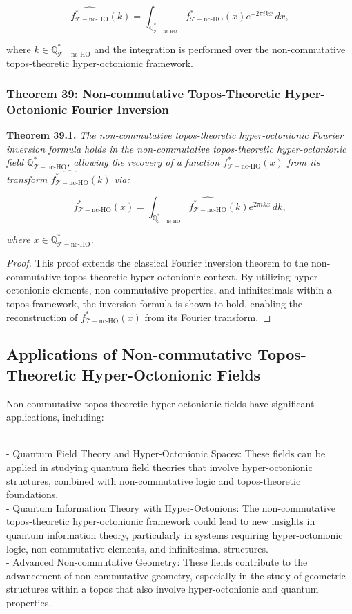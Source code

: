 \documentclass{article}
\begin{document}
\[
\widehat{f_{\mathcal{T}-\text{nc-HO}}^*}(k) = \int_{\mathbb{Q}_{\mathcal{T}-\text{nc-HO}}^*} f_{\mathcal{T}-\text{nc-HO}}^*(x) e^{-2\pi i k x} \, dx,
\]

where \(k \in \mathbb{Q}_{\mathcal{T}-\text{nc-HO}}^*\) and the integration is performed over the non-commutative topos-theoretic hyper-octonionic framework.

\subsubsection{Theorem 39: Non-commutative Topos-Theoretic Hyper-Octonionic Fourier Inversion}
\textbf{Theorem 39.1.} \textit{The non-commutative topos-theoretic hyper-octonionic Fourier inversion formula holds in the non-commutative topos-theoretic hyper-octonionic field \(\mathbb{Q}_{\mathcal{T}-\text{nc-HO}}^*\), allowing the recovery of a function \(f_{\mathcal{T}-\text{nc-HO}}^*(x)\) from its transform \(\widehat{f_{\mathcal{T}-\text{nc-HO}}^*}(k)\) via:}

\[
f_{\mathcal{T}-\text{nc-HO}}^*(x) = \int_{\mathbb{Q}_{\mathcal{T}-\text{nc-HO}}^*} \widehat{f_{\mathcal{T}-\text{nc-HO}}^*}(k) e^{2\pi i k x} \, dk,
\]

\textit{where \(x \in \mathbb{Q}_{\mathcal{T}-\text{nc-HO}}^*\).}

\begin{proof}
This proof extends the classical Fourier inversion theorem to the non-commutative topos-theoretic hyper-octonionic context. By utilizing hyper-octonionic elements, non-commutative properties, and infinitesimals within a topos framework, the inversion formula is shown to hold, enabling the reconstruction of \(f_{\mathcal{T}-\text{nc-HO}}^*(x)\) from its Fourier transform.
\end{proof}

\subsection{Applications of Non-commutative Topos-Theoretic Hyper-Octonionic Fields}
Non-commutative topos-theoretic hyper-octonionic fields have significant applications, including:

{\ }\\
- Quantum Field Theory and Hyper-Octonionic Spaces: These fields can be applied in studying quantum field theories that involve hyper-octonionic structures, combined with non-commutative logic and topos-theoretic foundations.
{\ }\\
- Quantum Information Theory with Hyper-Octonions: The non-commutative topos-theoretic hyper-octonionic framework could lead to new insights in quantum information theory, particularly in systems requiring hyper-octonionic logic, non-commutative elements, and infinitesimal structures.
{\ }\\
- Advanced Non-commutative Geometry: These fields contribute to the advancement of non-commutative geometry, especially in the study of geometric structures within a topos that also involve hyper-octonionic and quantum properties.
\end{document}
